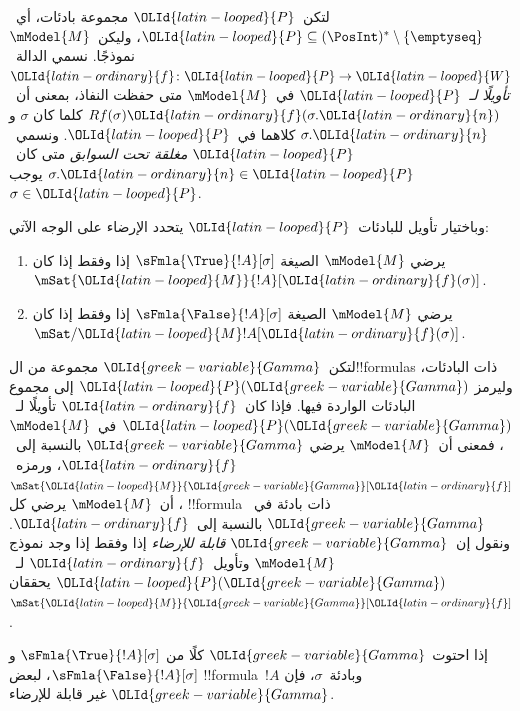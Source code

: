 \documentclass[../../../include/open-logic-section]{subfiles}
\begin{document}
\begin{defn}
  لتكن~${\OLId{latin-looped}{P}}$ مجموعة بادئات، أي~${\OLId{latin-looped}{P}} \subseteq (\PosInt)^*
  \setminus \{\emptyseq\}$، وليكن~$\mModel{M}$ نموذجًا.
  نسمي الدالة~${\OLId{latin-ordinary}{f}}\colon {\OLId{latin-looped}{P}} \to {\OLId{latin-looped}{W}}$ \emph{تأويلًا لـ}~${\OLId{latin-looped}{P}}$ في~$\mModel{M}$
  متى حفظت النفاذ، بمعنى أن~$Rf(\sigma){\OLId{latin-ordinary}{f}}(\sigma.{\OLId{latin-ordinary}{n}})$ كلما كان
  $\sigma$ و$\sigma.{\OLId{latin-ordinary}{n}}$ كلاهما في~${\OLId{latin-looped}{P}}$.
  ونسمي~${\OLId{latin-looped}{P}}$ \emph{مغلقة تحت السوابق} متى كان~$\sigma.{\OLId{latin-ordinary}{n}} \in {\OLId{latin-looped}{P}}$
  يوجب~$\sigma \in {\OLId{latin-looped}{P}}$.

  وباختيار تأويل للبادئات~${\OLId{latin-looped}{P}}$ يتحدد الإرضاء على الوجه الآتي:
  \begin{enumerate}
  \item يرضي $\mModel{M}$ الصيغة $\sFmla{\True}{!A}[\sigma]$ إذا وفقط إذا
    كان $\mSat{{\OLId{latin-looped}{M}}}{!A}[{\OLId{latin-ordinary}{f}}(\sigma)]$.
  \item يرضي $\mModel{M}$ الصيغة $\sFmla{\False}{!A}[\sigma]$ إذا وفقط إذا
    كان $\mSat/{{\OLId{latin-looped}{M}}}{!A}[{\OLId{latin-ordinary}{f}}(\sigma)]$.
  \end{enumerate}
\end{defn}

\begin{defn}
  لتكن~${\OLId{greek-variable}{Gamma}}$ مجموعة من ال!!{formula}s ذات البادئات، وليرمز
  ${\OLId{latin-looped}{P}}({\OLId{greek-variable}{Gamma}})$ إلى مجموع البادئات الواردة فيها. فإذا كان~${\OLId{latin-ordinary}{f}}$ تأويلًا
  لـ~${\OLId{latin-looped}{P}}({\OLId{greek-variable}{Gamma}})$ في~$\mModel{M}$، فمعنى أن~$\mModel{M}$ يرضي
  ${\OLId{greek-variable}{Gamma}}$ بالنسبة إلى~${\OLId{latin-ordinary}{f}}$، ورمزه~$\mSat{{\OLId{latin-looped}{M}}}{{\OLId{greek-variable}{Gamma}}}[{\OLId{latin-ordinary}{f}}]$، أن~$\mModel{M}$
  يرضي كل !!{formula} ذات بادئة في~${\OLId{greek-variable}{Gamma}}$ بالنسبة إلى~${\OLId{latin-ordinary}{f}}$.
  ونقول إن~${\OLId{greek-variable}{Gamma}}$ \emph{قابلة للإرضاء} إذا وفقط إذا وجد نموذج
  $\mModel{M}$ وتأويل~${\OLId{latin-ordinary}{f}}$ لـ~${\OLId{latin-looped}{P}}({\OLId{greek-variable}{Gamma}})$ يحققان~$\mSat{{\OLId{latin-looped}{M}}}{{\OLId{greek-variable}{Gamma}}}[{\OLId{latin-ordinary}{f}}]$.
\end{defn}

\begin{prop}
  إذا احتوت ${\OLId{greek-variable}{Gamma}}$ كلًا من $\sFmla{\True}{!A}[\sigma]$ و
  $\sFmla{\False}{!A}[\sigma]$، لبعض !!{formula}~$!A$ وبادئة~$\sigma$،
  فإن ${\OLId{greek-variable}{Gamma}}$ غير قابلة للإرضاء.
\end{prop}
\end{document}
